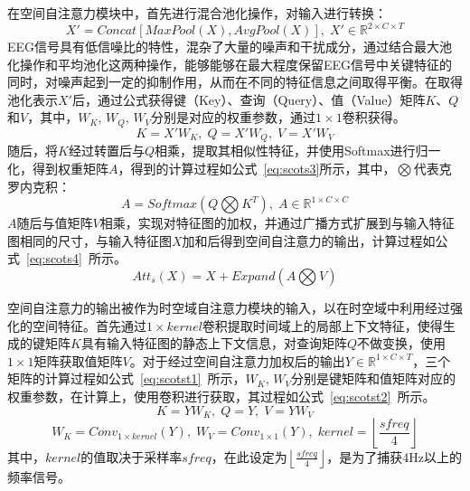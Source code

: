 在空间自注意力模块中，首先进行混合池化操作，对输入进行转换：
\begin{equation}
    X'=Concat[MaxPool(X),AvgPool(X)],\;X' \in \mathbb{R}^{2 \times C \times T}
    \label{eq:scots1}
\end{equation}
EEG信号具有低信噪比的特性，混杂了大量的噪声和干扰成分，通过结合最大池化操作和平均池化这两种操作，能够能够在最大程度保留EEG信号中关键特征的同时，对噪声起到一定的抑制作用，从而在不同的特征信息之间取得平衡。在取得池化表示\(X'\)后，通过公式获得键（Key）、查询（Query）、值（Value）矩阵\(K\)、\(Q\)和\(V\)，其中，\(W_K,\,W_Q,\,W_V\)分别是对应的权重参数，通过\(1\times1\)卷积获得。
\begin{equation}\label{eq:scots2}
    K=X'W_K,\;Q=X'W_Q,\;V=X'W_V
\end{equation}
随后，将\(K\)经过转置后与\(Q\)相乘，提取其相似性特征，并使用Softmax进行归一化，得到权重矩阵\(A\)，得到的计算过程如公式~\ref{eq:scots3}所示，其中，\(\bigotimes\)代表克罗内克积：
\begin{equation}\label{eq:scots3}
    A=Softmax(Q \bigotimes K^T),\;A \in \mathbb{R}^{1 \times C \times C}
\end{equation}
\(A\)随后与值矩阵\(V\)相乘，实现对特征图的加权，并通过广播方式扩展到与输入特征图相同的尺寸，与输入特征图\(X\)加和后得到空间自注意力的输出，计算过程如公式~\ref{eq:scots4}~所示。
\begin{equation}\label{eq:scots4}
    Att_s(X)=X+Expand(A \bigotimes V)
\end{equation}

空间自注意力的输出被作为时空域自注意力模块的输入，以在时空域中利用经过强化的空间特征。首先通过\(1 \times kernel\)卷积提取时间域上的局部上下文特征，使得生成的键矩阵\(K\)具有输入特征图的静态上下文信息，对查询矩阵\(Q\)不做变换，使用\(1\times1\)矩阵获取值矩阵\(V\)。对于经过空间自注意力加权后的输出\(Y  \in \mathbb{R}^{1 \times C \times T}\)，三个矩阵的计算过程如公式~\ref{eq:scotst1}~所示，\(W_K,\,W_V\)分别是键矩阵和值矩阵对应的权重参数，在计算上，使用卷积进行获取，其过程如公式~\ref{eq:scotst2}~所示。
\begin{equation}\label{eq:scotst1}
    K=YW_K,\;Q=Y,\;V=YW_V
\end{equation}
\begin{equation}\label{eq:scotst2}
    W_K=Conv_{1 \times kernel}(Y),\;W_V=Conv_{1 \times 1}(Y),\;kernel=\left \lfloor \frac{sfreq}{4} \right \rfloor 
\end{equation}
其中，\(kernel\)的值取决于采样率\(sfreq\)，在此设定为\(\left \lfloor \frac{sfreq}{4} \right \rfloor\)，是为了捕获4Hz以上的频率信号。

